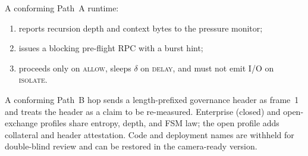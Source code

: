 \documentclass{article}
\begin{document}
A conforming Path~A runtime:
\begin{enumerate}
    \item reports recursion depth and context bytes to the pressure monitor;
    \item issues a blocking pre-flight RPC with a burst hint;
    \item proceeds only on \textsc{allow}, sleeps $\delta$ on \textsc{delay}, and must not emit I/O on \textsc{isolate}.
\end{enumerate}
A conforming Path~B hop sends a length-prefixed governance header as frame~1 and treats the header as a claim to be re-measured.
Enterprise (closed) and open-exchange profiles share entropy, depth, and FSM law; the open profile adds collateral and header attestation.
Code and deployment names are withheld for double-blind review and can be restored in the camera-ready version.
\end{document}
